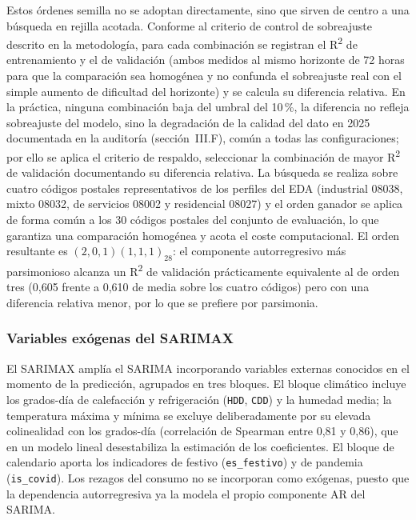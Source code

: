 \documentclass[12pt, a4paper]{article}
\begin{document}
Estos órdenes semilla no se adoptan directamente, sino que sirven de centro a una búsqueda en rejilla acotada. Conforme al criterio de control de sobreajuste descrito en la metodología, para cada combinación se registran el R\textsuperscript{2} de entrenamiento y el de validación (ambos medidos al mismo horizonte de 72 horas para que la comparación sea homogénea y no confunda el sobreajuste real con el simple aumento de dificultad del horizonte) y se calcula su diferencia relativa. En la práctica, ninguna combinación baja del umbral del 10\,\%,  la diferencia no refleja sobreajuste del modelo, sino la degradación de la calidad del dato en 2025 documentada en la auditoría (sección~III.F), común a todas las configuraciones; por ello se aplica el criterio de respaldo, seleccionar la combinación de mayor R\textsuperscript{2} de validación documentando su diferencia relativa. La búsqueda se realiza sobre cuatro códigos postales representativos de los perfiles del EDA (industrial 08038, mixto 08032, de servicios 08002 y residencial 08027) y el orden ganador se aplica de forma común a los 30 códigos postales del conjunto de evaluación, lo que garantiza una comparación homogénea y acota el coste computacional. El orden resultante es $(2,0,1)(1,1,1)_{28}$: el componente autorregresivo más parsimonioso alcanza un R\textsuperscript{2} de validación prácticamente equivalente al de orden tres (0,605 frente a 0,610 de media sobre los cuatro códigos) pero con una diferencia relativa menor, por lo que se prefiere por parsimonia.

\subsubsection{Variables exógenas del SARIMAX}

El SARIMAX amplía el SARIMA incorporando variables externas conocidos en el momento de la predicción, agrupados en tres bloques. El bloque climático incluye los grados-día de calefacción y refrigeración (\texttt{HDD}, \texttt{CDD}) y la humedad media; la temperatura máxima y mínima se excluye deliberadamente por su elevada colinealidad con los grados-día (correlación de Spearman entre 0,81 y 0,86), que en un modelo lineal desestabiliza la estimación de los coeficientes. El bloque de calendario aporta los indicadores de festivo (\texttt{es\_festivo}) y de pandemia (\texttt{is\_covid}). Los rezagos del consumo no se incorporan como exógenas, puesto que la dependencia autorregresiva ya la modela el propio componente AR del SARIMA.
\end{document}
